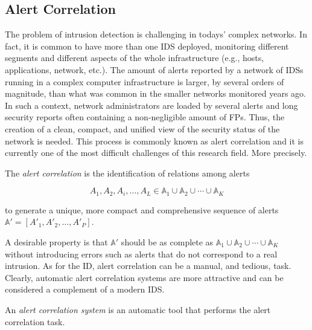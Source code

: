\subsection{Alert Correlation}
\label{detection:id:alert-correlation} The problem of intrusion
detection is challenging in todays' complex networks. In fact, it is
common to have more than one \ac{IDS} deployed, monitoring
different segments and different aspects of the whole infrastructure
(e.g., hosts, applications, network, etc.). The amount of alerts
reported by a network of \acp{IDS} running in a complex
computer infrastructure is larger, by several orders of magnitude,
than what was common in the smaller networks monitored years ago. In
such a context, network administrators are loaded by several alerts
and long security reports often containing a non-negligible amount of
\acp{FP}. Thus, the creation of a clean, compact, and
unified view of the security status of the network is needed. This
process is commonly known as alert correlation
\citep{valeur04comprehensive} and it is currently one of the most
difficult challenges of this research field. More precisely.

\begin{definition}
  The \emph{alert correlation} is the identification of relations
  among alerts

  \begin{displaymath}
    A_{1}, A_{2}, A_{i}, \dots, A_{L} \in \mathbb{A}_{1} \cup
    \mathbb{A}_{2} \cup \cdots \cup \mathbb{A}_{K}
  \end{displaymath}

  to generate a unique, more compact and comprehensive sequence of
  alerts $\mathbb{A'} = [A'_{1}, A'_{2}, \dots, A'_{P}]$.
\end{definition}

A desirable property is that $\mathbb{A}'$ should be as complete as
$\mathbb{A}_{1} \cup \mathbb{A}_{2} \cup \cdots \cup \mathbb{A}_{K}$
without introducing errors such as alerts that do not correspond to a
real intrusion. As for the \ac{ID}, alert correlation can be a manual,
and tedious, task. Clearly, automatic alert correlation systems are
more attractive and can be considered a complement of a modern
\ac{IDS}.

\begin{definition}
  An \emph{alert correlation system} is an automatic tool that
  performs the alert correlation task.
\end{definition}

